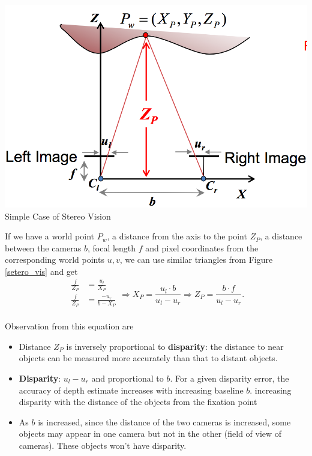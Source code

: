 \documentclass[a4paper,12 pt]{article}
\theoremstyle{definition}
\theoremstyle{remark}
\theoremstyle{definition}
\theoremstyle{definition}
\theoremstyle{definition}
\theoremstyle{definition}
\theoremstyle{remark}
\theoremstyle{remark}
\theoremstyle{definition}
\theoremstyle{definition}
\begin{document}
\begin{enumerate}
\begin{enumerate}
\begin{minipage}{0.3 \columnwidth}
\includegraphics[width=\textwidth]{pics/stereo_vis}
\tiny{Simple Case of Stereo Vision}\label{setero_vis}
\end{minipage}
\hfill
\begin{minipage}{0.6 \columnwidth}
If we have a world point $P_w$, a distance from the axis to the point $Z_P$, a distance between the cameras $b$, focal length $f$ and pixel coordinates from the corresponding world points $u,v$, we can use similar triangles from Figure \ref{setero_vis} and get
\begin{equation}
\begin{split}
\frac{f}{Z_P}&=\frac{u_l}{X_P}\\
\frac{f}{Z_P}&=\frac{-u_r}{b-X_P}\\
\end{split}
\Rightarrow X_P=\frac{u_l\cdot b}{u_l-u_r}
\Rightarrow Z_P=\frac{b\cdot f}{u_l-u_r}.
\end{equation}
\end{minipage}
Observation from this equation are
\begin{itemize}
\item Distance $Z_P$ is inversely proportional to \textbf{disparity}: the distance to near objects can be measured more accurately than that to distant objects.
\item \textbf{Disparity}: $u_l-u_r$ and proportional to $b$.  For a given disparity error, the accuracy of depth estimate increases with increasing baseline $b$. increasing disparity with the distance of the objects from the fixation point 
\item As $b$ is increased, since the distance of the two cameras is increased, some objects may appear in one camera but not in the other (field of view of cameras). These objects won't have disparity.

\end{itemize}
\end{enumerate}
\end{enumerate}
\end{document}
